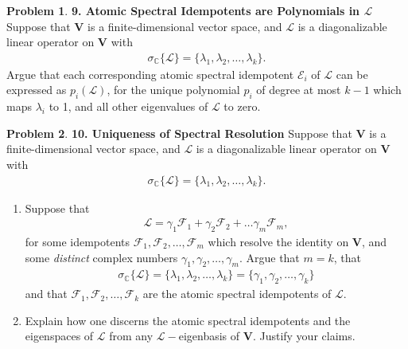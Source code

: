 \documentclass{book}
\theoremstyle{definition}
\newtheorem*{prob*}{Problem}
\newcommand{\F}{\mathcal{F}}
\newcommand{\V}{\mathbf{V}}
\newcommand{\lag}{\mathcal{L}}
\newcommand{\E}{\mathcal{E}}
\begin{document}
\newpage



\begin{prob*}\textbf{9. Atomic Spectral Idempotents are Polynomials in $\lag$}
	Suppose that $\V$ is a finite-dimensional vector space, and $\lag$ is a diagonalizable linear operator on $\V$ with
	\begin{align*}
	\sigma_{\mathbb{C}}\{ \lag\} = \{\lambda_1, \lambda_2,\dots,\lambda_k\}.
	\end{align*}
	Argue that each corresponding atomic spectral idempotent $\E_i$ of $\lag$ can be expressed as $p_i(\lag)$, for the unique polynomial $p_i$ of degree at most $k-1$ which maps $\lambda_i$ to 1, and all other eigenvalues of $\lag$ to zero. 
\end{prob*}





\newpage




\begin{prob*}\textbf{10. Uniqueness of Spectral Resolution}
	Suppose that $\V$ is a finite-dimensional vector space, and $\lag$ is a diagonalizable linear operator on $\V$ with 
	\begin{align*}
	\sigma_{\mathbb{C}}\{ \lag\} = \{\lambda_1, \lambda_2,\dots,\lambda_k\}.
	\end{align*}
	\begin{enumerate}
		\item Suppose that 
		\begin{align*}
		\lag = \gamma_1\F_1 + \gamma_2\F_2 + \dots \gamma_m\F_m,
		\end{align*}
		for some idempotents $\F_1,\F_2,\dots,\F_m$ which resolve the identity on $\V$, and some \textit{distinct} complex numbers $\gamma_1,\gamma_2,\dots,\gamma_m$. Argue that $m=k$, that
		\begin{align*}
		\sigma_{\mathbb{C}}\{ \lag\} = \{\lambda_1, \lambda_2,\dots,\lambda_k\} = \{\gamma_1, \gamma_2,\dots,\gamma_k\}
		\end{align*}
		and that $\F_1,\F_2,\dots,\F_k$ are the atomic spectral idempotents of $\lag$. 
		
		
		
		
		\item Explain how one discerns the atomic spectral idempotents and the eigenspaces of $\lag$ from any $\lag-$eigenbasis of $\V$. Justify your claims. 
	\end{enumerate}
	
\end{prob*}
\end{document}

